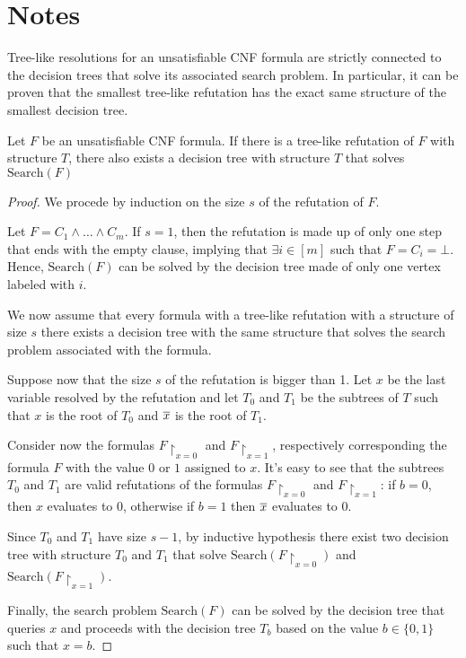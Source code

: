 

\chapter{Notes} \label{chap:notes}

Tree-like resolutions for an unsatisfiable CNF formula are strictly connected to the decision trees that solve its associated search problem. In particular, it can be proven that the smallest tree-like refutation has the exact same structure of the smallest decision tree. 

\begin{lemma} \label{lem:treeres_dt}
    \cite{treelike_res_size}
    Let $F$ be an unsatisfiable CNF formula. If there is a tree-like refutation of $F$ with structure $T$, there also exists a decision tree with structure $T$ that solves $\mathrm{Search}(F)$
\end{lemma}

\begin{proof}
    We procede by induction on the size $s$ of the refutation of $F$.

    Let $F = C_1 \land \ldots \land C_m$. If $s = 1$, then the refutation is made up of only one step that ends with the empty clause, implying that $\exists i \in [m]$ such that $F = C_i = \bot$. Hence, $\mathrm{Search}(F)$ can be solved by the decision tree made of only one vertex labeled with $i$.

    We now assume that every formula with a tree-like refutation with a structure of size $s$ there exists a decision tree with the same structure that solves the search problem associated with the formula.

    Suppose now that the size $s$ of the refutation is bigger than 1. Let $x$ be the last variable resolved by the refutation and let $T_0$ and $T_1$ be the subtrees of $T$ such that $x$ is the root of $T_0$ and $\overline{x}$ is the root of $T_1$.

    Consider now the formulas $F{\upharpoonright_{x=0}}$ and $F{\upharpoonright_{x=1}}$, respectively corresponding the formula $F$ with the value $0$ or $1$ assigned to $x$. It's easy to see that the subtrees $T_0$ and $T_1$ are valid refutations of the formulas $F{\upharpoonright_{x=0}}$ and $F{\upharpoonright_{x=1}}$: if $b = 0$, then $x$ evaluates to $0$, otherwise if $b = 1$ then $\overline{x}$ evaluates to 0.

    Since $T_0$ and $T_1$ have size $s-1$, by inductive hypothesis there exist two decision tree with structure $T_0$ and $T_1$ that solve $\mathrm{Search}(F{\upharpoonright_{x=0}})$ and $\mathrm{Search}(F{\upharpoonright_{x=1}})$.

    Finally, the search problem $\mathrm{Search}(F)$ can be solved by the decision tree that queries $x$ and proceeds with the decision tree $T_b$ based on the value $b \in \{0,1\}$ such that $x = b$.

\end{proof}

